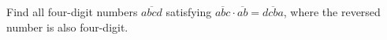 Find all four-digit numbers $\overline{abcd}$ satisfying $\overline{abc}\cdot\overline{ab}=\overline{dcba}$, where the reversed number is also four-digit.
